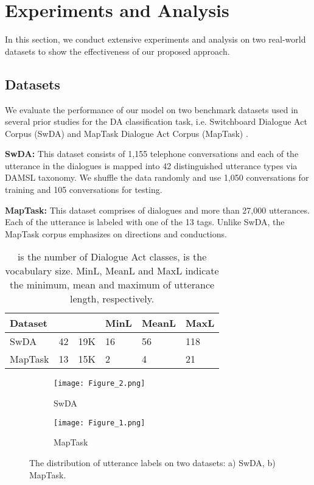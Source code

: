 \documentclass[conference]{IEEEtran}
\begin{document}
	\section{Experiments and Analysis}\label{sec_experiments}
	In this section, we conduct extensive experiments and analysis on two real-world datasets to show the effectiveness of our proposed approach. 
	\subsection{Datasets}  
	We evaluate the performance of our model on two benchmark datasets used in several prior studies for the DA classification task, i.e.  Switchboard Dialogue Act Corpus (SwDA) \cite{godfrey1992switchboard} and MapTask Dialogue Act Corpus (MapTask) \cite{anderson1991hcrc}.  

	\textbf{SwDA:} This dataset consists of 1,155 telephone conversations and each of the utterance in the dialogues is mapped into 42 distinguished utterance types via DAMSL taxonomy. We shuffle the data randomly and use 1,050 conversations for training and 105 conversations for testing. 

	\textbf{MapTask:} This dataset comprises of  dialogues and more than 27,000 utterances. Each of the utterance is labeled with one of the 13 tags. Unlike SwDA, the MapTask corpus emphasizes on directions and conductions.

	\begin{table}[!t]
		\centering
		\begin{tabular}{|l|l|l|l|l|l|}
			\hline
			Dataset &&&MinL&MeanL&MaxL\\
			\hline
			SwDA&42&19K&16&56&118\\
			MapTask&13&15K&2&4&21\\
			\hline
		\end{tabular}
		\caption{ is the number of Dialogue Act classes,  is the vocabulary size. MinL, MeanL and MaxL indicate the minimum, mean and maximum of utterance length, respectively.}
		\label{table:stastic}
	\end{table}
	
	\begin{figure}[!t]
		\centering
		\begin{subfigure}[b]{0.49\textwidth}
			\texttt{[image: Figure\_2.png]}
			\caption{SwDA}
			\label{fig_varadv_swda}
		\end{subfigure}
		\begin{subfigure}[b]{0.49\textwidth}
			\texttt{[image: Figure\_1.png]}
			\caption{MapTask}
			\label{fig_varadv_maptaskr}
		\end{subfigure}
		\caption{The distribution of utterance labels on two datasets: a) SwDA, b) MapTask.}
		\label{fig_length_distribution}
		\vspace{-0.8em}
	\end{figure}
	
\end{document}

